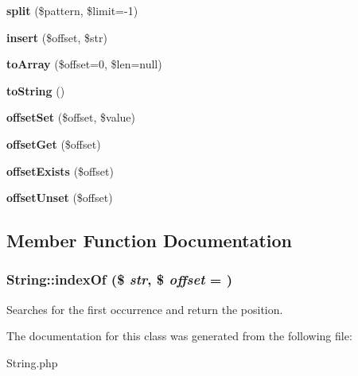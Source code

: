 \begin{DoxyCompactItemize}
\item 
\hypertarget{classString_af1ceaa53461e40a69de4f14a115d7d56}{
{\bfseries split} (\$pattern, \$limit=-\/1)}
\label{classString_af1ceaa53461e40a69de4f14a115d7d56}

\item 
\hypertarget{classString_abe7d7e1e2b57ab7dcd01d8e2d1d53148}{
{\bfseries insert} (\$offset, \$str)}
\label{classString_abe7d7e1e2b57ab7dcd01d8e2d1d53148}

\item 
\hypertarget{classString_abacf7b1614b42312f4f49ca064980139}{
{\bfseries toArray} (\$offset=0, \$len=null)}
\label{classString_abacf7b1614b42312f4f49ca064980139}

\item 
\hypertarget{classString_aa7ef98a0c1a4b8b375baf8791e7b773c}{
{\bfseries toString} ()}
\label{classString_aa7ef98a0c1a4b8b375baf8791e7b773c}

\item 
\hypertarget{classString_a6a17056cddb17560a093b846c6168537}{
{\bfseries offsetSet} (\$offset, \$value)}
\label{classString_a6a17056cddb17560a093b846c6168537}

\item 
\hypertarget{classString_a4627964e8bc80f485b4b7c1b1c609820}{
{\bfseries offsetGet} (\$offset)}
\label{classString_a4627964e8bc80f485b4b7c1b1c609820}

\item 
\hypertarget{classString_a0ad487f2acca3753cd9d42cf9325225e}{
{\bfseries offsetExists} (\$offset)}
\label{classString_a0ad487f2acca3753cd9d42cf9325225e}

\item 
\hypertarget{classString_af12691beca61c36ac057a8515b2f4bfe}{
{\bfseries offsetUnset} (\$offset)}
\label{classString_af12691beca61c36ac057a8515b2f4bfe}

\end{DoxyCompactItemize}


\subsection{Member Function Documentation}
\hypertarget{classString_a5069041d10f95e4ec9a4be3cd17ab180}{
\subsubsection[{indexOf}]{\setlength{\rightskip}{0pt plus 5cm}String::indexOf (\$ {\em str}, \/  \$ {\em offset} = {})}}
\label{classString_a5069041d10f95e4ec9a4be3cd17ab180}
Searches for the first occurrence and return the position. 

The documentation for this class was generated from the following file:\begin{DoxyCompactItemize}
\item 
String.php\end{DoxyCompactItemize}
